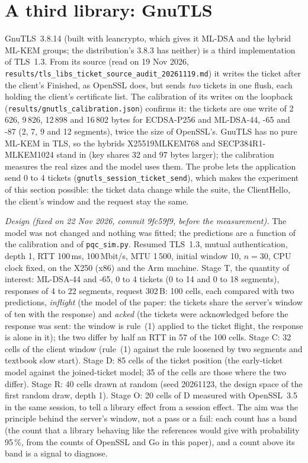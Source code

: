 \documentclass[9pt]{article}
\begin{document}
\section*{A third library: GnuTLS}
GnuTLS~3.8.14 (built with leancrypto, which gives it ML-DSA and the hybrid ML-KEM groups; the distribution's 3.8.3 has neither) is a third implementation of TLS~1.3. From its source (read on 19 Nov 2026, \texttt{results/tls\_libs\_ticket\_source\_audit\_20261119.md}) it writes the ticket after the client's Finished, as OpenSSL does, but sends \emph{two} tickets in one flush, each holding the client's certificate list. The calibration of its writes on the loopback (\texttt{results/gnutls\_calibration.json}) confirms it: the tickets are one write of 2\,626, 9\,826, 12\,898 and 16\,802 bytes for ECDSA-P256 and ML-DSA-44, -65 and -87 (2, 7, 9 and 12 segments), twice the size of OpenSSL's. GnuTLS has no pure ML-KEM in TLS, so the hybrids X25519MLKEM768 and SECP384R1-MLKEM1024 stand in (key shares 32 and 97 bytes larger); the calibration measures the real sizes and the model uses them. The probe lets the application send 0 to 4 tickets (\texttt{gnutls\_session\_ticket\_send}), which makes the experiment of this section possible: the ticket data change while the suite, the ClientHello, the client's window and the request stay the same.

\emph{Design (fixed on 22 Nov 2026, commit 9fc59f9, before the measurement).} The model was not changed and nothing was fitted; the predictions are a function of the calibration and of \texttt{pqc\_sim.py}. Resumed TLS~1.3, mutual authentication, depth 1, RTT 100\,ms, 100\,Mbit/s, MTU 1\,500, initial window 10, $n=30$, CPU clock fixed, on the X250 (x86) and the Arm machine. Stage T, the quantity of interest: ML-DSA-44 and -65, 0 to 4 tickets (0 to 14 and 0 to 18 segments), responses of 4 to 22 segments, request 302\,B: 100 cells, each compared with two predictions, \emph{inflight} (the model of the paper: the tickets share the server's window of ten with the response) and \emph{acked} (the tickets were acknowledged before the response was sent: the window is rule~(1) applied to the ticket flight, the response is alone in it); the two differ by half an RTT in 57 of the 100 cells. Stage C: 32 cells of the client window (rule~(1) against the rule loosened by two segments and textbook slow start). Stage D: 85 cells of the ticket position (the early-ticket model against the joined-ticket model; 35 of the cells are those where the two differ). Stage R: 40 cells drawn at random (seed 20261123, the design space of the first random draw, depth 1). Stage O: 20 cells of D measured with OpenSSL~3.5 in the same session, to tell a library effect from a session effect. The aim was the principle behind the server's window, not a pass or a fail: each count has a band (the count that a library behaving like the references would give with probability 95\,\%, from the counts of OpenSSL and Go in this paper), and a count above its band is a signal to diagnose.
\end{document}
